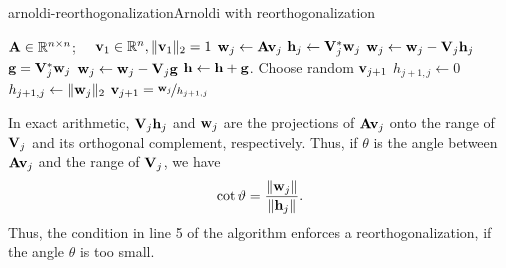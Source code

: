 \begin{Algorithm*}{arnoldi-reorthogonalization}{Arnoldi with reorthogonalization}
  \begin{algorithmic}[1]
    \Require $\mathbf A\in\mathbb R^{n\times n}$; $\quad\mathbf v_1\in\mathbb R^n, \lVert\mathbf v_1\rVert_2 = 1$
    \State $\mathbf w_j \gets \mathbf A\mathbf v_j$
    \State $\mathbf h_{j} \gets \mathbf V_j^*\mathbf w_j$
    \State $\mathbf w_j \gets \mathbf w_j - \mathbf V_j\mathbf h_{j}$
     
    \State $\mathbf g = \mathbf V_j^*\mathbf w_j$
    \State $\mathbf w_j \gets \mathbf w_j - \mathbf V_j\mathbf g$
    \State $\mathbf h \gets \mathbf h + \mathbf g$.
    \EndIf
    \State Choose random $\mathbf v_{j+1}$
    \State $h_{j+1,j} \gets 0$
    \Else
    \State $h_{j+1,j} \gets \lVert\mathbf w_j\rVert_2$
    \State $\mathbf v_{j+1} = \nicefrac{\mathbf w_j}{h_{j+1,j}}$
    \EndIf
    \EndFor
  \end{algorithmic}
\end{Algorithm*}

\begin{remark}
  In exact arithmetic, $\mathbf V_j\mathbf h_j$ and $\mathbf w_j$ are the projections
  of $\mathbf A\mathbf v_j$ onto the range of $\mathbf V_j$ and its orthogonal
  complement, respectively. Thus, if $\theta$ is the angle between
  $\mathbf A\mathbf v_j$ and the range of $\mathbf V_j$, we have
  \begin{gather}
    \cot\vartheta = \frac{\lVert\mathbf w_j\rVert}{\lVert\mathbf h_j\rVert}.
  \end{gather}
  Thus, the condition in line 5 of the algorithm enforces a
  reorthogonalization, if the angle $\theta$ is too small.
\end{remark}

